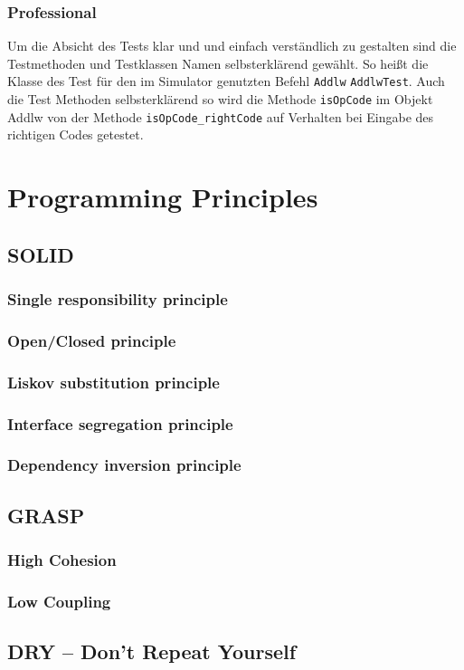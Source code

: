 \documentclass[12pt,a4paper,titlepage,ngerman,pdftex]{report}
\begin{document}
    \subsubsection{Professional}
    Um die Absicht des Tests klar und und einfach verständlich zu gestalten sind die Testmethoden und Testklassen Namen selbsterklärend gewählt. 
    So heißt die Klasse des Test für den im Simulator genutzten Befehl \verb|Addlw|  \verb|AddlwTest|.
    Auch die Test Methoden selbsterklärend so wird die Methode \verb|isOpCode| im Objekt Addlw von der Methode \verb|isOpCode_rightCode| auf Verhalten bei Eingabe des richtigen Codes getestet.

    \section{Programming Principles}

    \subsection{SOLID}
    
    \subsubsection{Single responsibility principle}

    \subsubsection{Open/Closed principle}

    \subsubsection{Liskov substitution principle}

    \subsubsection{Interface segregation principle}

    \subsubsection{Dependency inversion principle}

    \subsection{GRASP}

    \subsubsection{High Cohesion}

    \subsubsection{Low Coupling}
    
    \subsection{DRY -- Don't Repeat Yourself}
\end{document}
